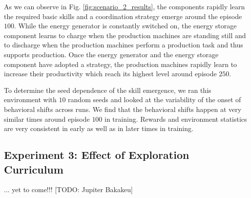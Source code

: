 As we can observe in Fig. \ref{fig:scenario_2_results}, the components rapidly learn the required basic skills and a coordination strategy emerge around the episode $100$. While the energy generator is constantly switched on, the energy storage component learns to charge when the production machines are standing still and to discharge when the production machines perform a production task and thus supports production. Once the energy generator and the energy storage component have adopted a strategy, the production machines rapidly learn to increase their productivity which reach its highest level around episode $250$.

To determine the seed dependence of the skill emergence, we ran this environment with $10$ random seeds and looked at the variability of the onset of behavioral shifts across runs. We find that the behavioral shifts happen at very similar times around episode $100$ in training. Rewards and environment statistics are very consistent in early as well as in later times in training.

\subsection{Experiment 3: Effect of Exploration Curriculum}
\label{subsec:53}
... yet to come!!! [TODO: Jupiter Bakakeu]
